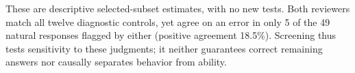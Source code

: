 These are descriptive selected-subset estimates, with no new tests. Both
reviewers match all twelve diagnostic controls, yet agree on an error in only
5 of the 49 natural responses flagged by either (positive agreement 18.5\%).
Screening thus tests sensitivity to these judgments; it neither guarantees
correct remaining answers nor causally separates behavior from ability.

